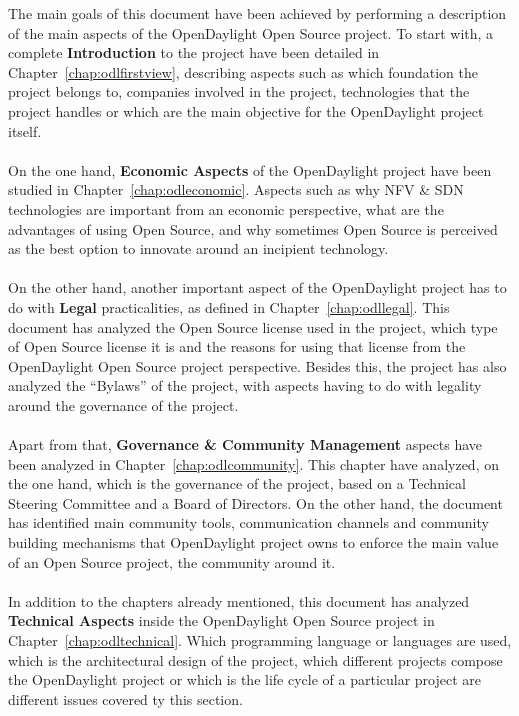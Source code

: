 \documentclass[a4paper, 12pt]{book}
\begin{document}
The main goals of this document have been achieved by performing a description of the main aspects of the OpenDaylight Open Source project. To start with, a complete \textbf{Introduction} to the project have been detailed in Chapter~\ref{chap:odlfirstview}, describing aspects such as which foundation the project belongs to, companies involved in the project, technologies that the project handles or which are the main objective for the OpenDaylight project itself.\\
\\
On the one hand, \textbf{Economic Aspects} of the OpenDaylight project have been studied in Chapter~\ref{chap:odleconomic}. Aspects such as why NFV \& SDN technologies are important from an economic perspective, what are the advantages of using Open Source, and why sometimes Open Source is perceived as the best option to innovate around an incipient technology.\\
\\
On the other hand, another important aspect of the OpenDaylight project has to do with \textbf{Legal} practicalities, as defined in Chapter~\ref{chap:odllegal}. This document has analyzed the Open Source license used in the project, which type of Open Source license it is and the reasons for using that license from the OpenDaylight Open Source project perspective. Besides this, the project has also analyzed the ``Bylaws'' of the project, with aspects having to do with legality around the governance of the project.\\
\\
Apart from that, \textbf{Governance \& Community Management} aspects have been analyzed in Chapter~\ref{chap:odlcommunity}. This chapter have analyzed, on the one hand, which is the governance of the project, based on a Technical Steering Committee and a Board of Directors. On the other hand, the document has identified main community tools, communication channels and community building mechanisms that OpenDaylight project owns to enforce the main value of an Open Source project, the community around it.\\
\\
In addition to the chapters already mentioned, this document has analyzed \textbf{Technical Aspects} inside the OpenDaylight Open Source project in Chapter~\ref{chap:odltechnical}. Which programming language or languages are used, which is the architectural design of the project, which different projects compose the OpenDaylight project or which is the life cycle of a particular project are different issues covered ty this section.\\
\end{document}
